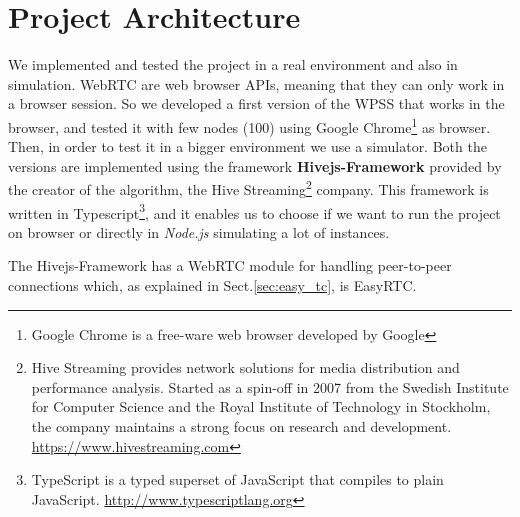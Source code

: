 \chapter{Project Architecture}
\label{cha:arc}
We implemented and tested the project in a real environment and also in simulation. WebRTC are web browser APIs, meaning that they can only work in a browser session. So we developed a first version of the WPSS that works in the browser, and tested it with few nodes (100) using Google Chrome\footnote{Google Chrome is a free-ware web browser developed by Google} as browser. Then, in order to test it in a bigger environment we use a simulator. Both the versions are implemented using the framework \textbf{Hivejs-Framework} provided by the creator of the algorithm, the Hive Streaming\footnote{Hive Streaming provides network solutions for media distribution and performance analysis. Started as a spin-off in 2007 from the Swedish Institute for Computer Science and the Royal Institute of Technology in Stockholm, the company maintains a strong focus on research and development. \url{https://www.hivestreaming.com}} company. This framework is written in Typescript\footnote{TypeScript is a typed superset of JavaScript that compiles to plain JavaScript. \url{http://www.typescriptlang.org}}, and it enables us to choose if we want to run the project on browser or directly in \textit{Node.js} simulating a lot of instances. 

The Hivejs-Framework has a WebRTC module for handling peer-to-peer connections which, as explained in Sect.\ref{sec:easy_tc}, is EasyRTC. 